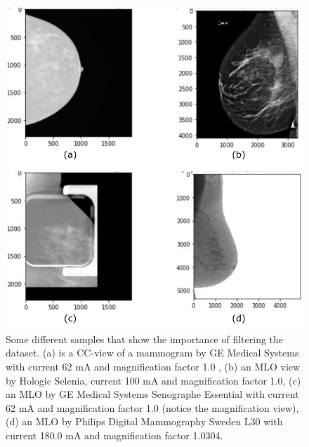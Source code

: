 \documentclass[final,3p,twocolumn,authoryear,sort&compress,times]{maia}
\begin{document}
\begin{figure}[h]
    \centering
    \includegraphics[scale=0.55]{figures/filtering_dataset.pdf}
    \caption{Some different samples that show the importance of filtering the dataset. (a) is a CC-view of a mammogram by GE Medical Systems with current 62 mA and magnification factor 1.0 , (b) an MLO view by Hologic Selenia, current 100 mA and magnification factor 1.0, (c) an MLO by GE Medical Systems Senographe Essential with current 62 mA and magnification factor 1.0 (notice the magnification view), (d) an MLO by Philips Digital Mammography Sweden L30 with current 180.0 mA and magnification factor 1.0304.}
    \label{fig:useless_samples}
\end{figure}
\end{document}
